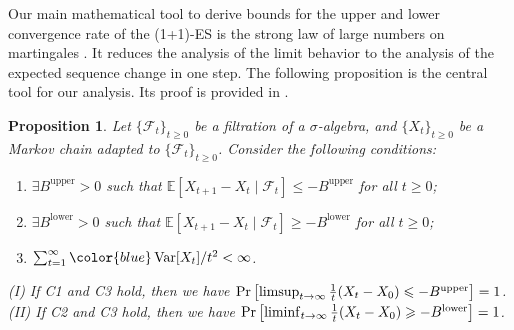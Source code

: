 \documentclass[journal]{IEEEtran}
\providecommand{\limsup}{\operatornamewithlimits{limsup}} %
\providecommand{\liminf}{\operatornamewithlimits{liminf}} %
\DeclareMathOperator{\Var}{Var}   %
\providecommand{\R}{\mathbb{R}} %
\providecommand{\E}{\mathbb{E}} %
\renewcommand{\geq}{\geqslant} %
\renewcommand{\leq}{\leqslant} %
\newtheorem{proposition}[theorem]{Proposition}
\theoremstyle{definition}
\newtheorem{definition}[]{Definition}
\begin{document}
Our main mathematical tool to derive bounds for the upper and lower convergence rate of the (1+1)-ES is the strong law of large numbers on martingales \cite{chow1967strong}.
It reduces the analysis of the limit behavior to the analysis of the expected sequence change in one step. 
The following proposition is the central tool for our analysis.
Its proof is provided in .
\begin{proposition}\label{prop:convergence_rate}
Let $\{\mathcal{F}_t\}_{t \geq 0}$ be a filtration of a $\sigma$-algebra, and $\{X_t\}_{t \geq 0}$ be a Markov chain adapted to $\{\mathcal{F}_t\}_{t \geq 0}$.
Consider the following conditions:
\begin{enumerate}
\item[C1] $\exists B^\mathrm{upper} > 0$ such that $\E[X_{t+1} - X_{t} \mid \mathcal{F}_t] \leq - B^\mathrm{upper}$ for all $t \geq 0$;
\item[C2] $\exists B^\mathrm{lower} > 0$ such that $\E[X_{t+1} - X_{t} \mid \mathcal{F}_t] \geq - B^\mathrm{lower}$ for all $t \geq 0$;
\item[C3] $\sum_{t=1}^{\infty}{\color{blue}\Var[X_{t}]} / t^2 < \infty$.
\end{enumerate}
(I) If C1 and C3 hold, then we have
$\Pr\left[\limsup_{t \to \infty} \frac{1}{t} (X_t - X_0) \leq - B^\mathrm{upper} \right] = 1$.
(II) If C2 and C3 hold, then we have 
$\Pr\left[\liminf_{t \to \infty} \frac{1}{t} (X_t - X_0) \geq - B^\mathrm{lower} \right] = 1$.
\end{proposition}


\end{document}
